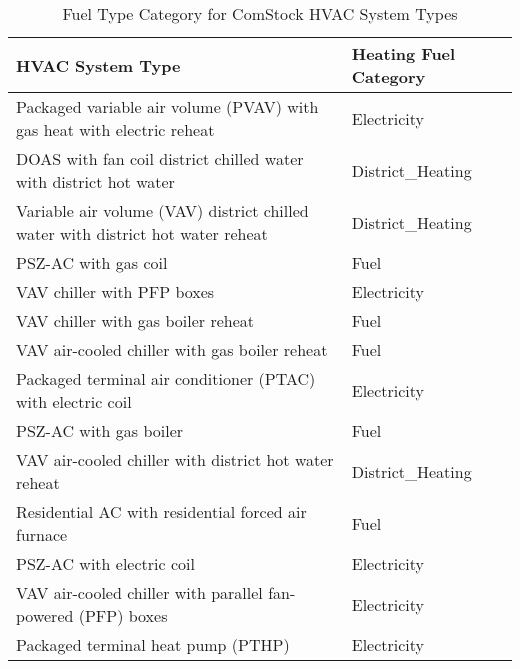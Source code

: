 \begin{table}[hb!]
\small
\centering
\caption[Fuel Type Category for ComStock HVAC System Types]{Fuel Type Category for ComStock HVAC System Types}
\label{tab:hvac_system_heating_fuel_categories}
\begin{tabular}{|l|l|}
\hline
\textbf{HVAC System Type}                                   & \textbf{Heating Fuel Category} \\ \hline
Packaged variable air volume (PVAV) with gas heat with electric reheat                     & Electricity                           \\ \hline
DOAS with fan coil district chilled water with district hot water & District\_Heating        \\ \hline
Variable air volume (VAV) district chilled water with district hot water reheat         & District\_Heating        \\ \hline
PSZ-AC with gas coil                                        & Fuel                           \\ \hline
VAV chiller with PFP boxes                                  & Electricity                    \\ \hline
VAV chiller with gas boiler reheat                          & Fuel                           \\ \hline
VAV air-cooled chiller with gas boiler reheat               & Fuel                           \\ \hline
Packaged terminal air conditioner (PTAC) with electric coil                                     & Electricity                    \\ \hline
PSZ-AC with gas boiler                                      & Fuel                           \\ \hline
VAV air-cooled chiller with district hot water reheat       & District\_Heating              \\ \hline
Residential AC with residential forced air furnace          & Fuel                           \\ \hline
PSZ-AC with electric coil                                   & Electricity                    \\ \hline
VAV air-cooled chiller with parallel fan-powered (PFP) boxes                       & Electricity                    \\ \hline
Packaged terminal heat pump (PTHP)                                                        & Electricity                    \\ \hline

\end{tabular}
\end{table}
